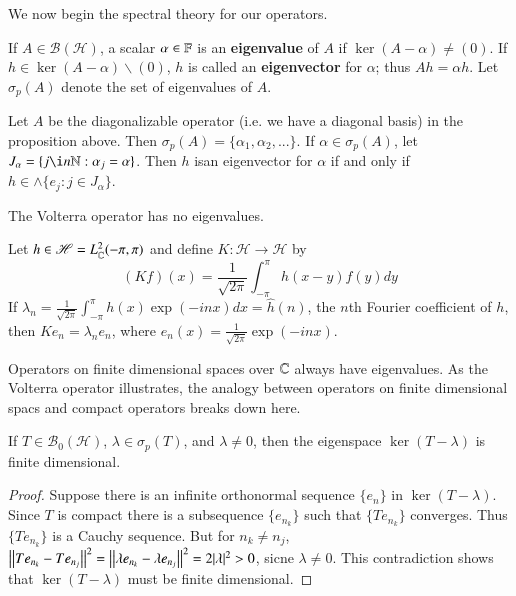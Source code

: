 We now begin the spectral theory for our operators.

\begin{defn}
    If $A \in \mathscr{B}(\mathscr{H})$, a scalar $\alpha \in \mathbb F$ is an \textbf{eigenvalue} of $A$ if $\ker(A-\alpha) \neq (0)$. If $h \in \ker(A-\alpha)\backslash(0)$, $h$ is called an \textbf{eigenvector} for $\alpha$; thus $Ah = \alpha h$. Let $\sigma_p(A)$ denote the set of eigenvalues of $A$.
\end{defn}

\begin{eg}
    Let $A$ be the diagonalizable operator (i.e. we have a diagonal basis) in the proposition above. Then $\sigma_p(A) = \{\alpha_1,\alpha_2,...\}$. If $\alpha \in \sigma_p(A)$, let $J_{\alpha} = \{j \i n\N:\alpha_j = \alpha\}$. Then $h$ isan eigenvector for $\alpha$ if and only if $h \in \land\{e_j:j \in J_{\alpha}\}$.
\end{eg}

\begin{eg}
    The Volterra operator has no eigenvalues.
\end{eg}

\begin{eg}
    Let $h \in \mathscr{H} = L^2_{\mathbb C}(-\pi,\pi)$ and define $K:\mathscr{H}\rightarrow \mathscr{H}$ by $$(Kf)(x) = \frac{1}{\sqrt{2\pi}}\int_{-\pi}^{\pi}h(x-y)f(y)dy$$
    If $\lambda_n = \frac{1}{\sqrt{2\pi}}\int_{-\pi}^{\pi}h(x)\exp(-inx)dx = \hat{h}(n)$, the $n$th Fourier coefficient of $h$, then $Ke_n = \lambda_ne_n$, where $e_n(x) = \frac{1}{\sqrt{2\pi}}\exp(-inx)$.
\end{eg}

Operators on finite dimensional spaces over $\mathbb C$ always have eigenvalues. As the Volterra operator illustrates, the analogy between operators on finite dimensional spacs and compact operators breaks down here.

\begin{prop}
    If $T \in \mathscr{B}_0(\mathscr{H})$, $\lambda \in \sigma_p(T)$, and $\lambda \neq 0$, then the eigenspace $\ker(T-\lambda)$ is finite dimensional.
\end{prop}
\begin{proof}
    Suppose there is an infinite orthonormal sequence $\{e_n\}$ in $\ker(T-\lambda)$. Since $T$ is compact there is a subsequence $\{e_{n_k}\}$ such that $\{Te_{n_k}\}$ converges. Thus $\{Te_{n_k}\}$ is a Cauchy sequence. But for $n_k \neq n_j$, $\left|\left| Te_{n_k}-Te_{n_j}\right|\right|^2 = \left|\left| \lambda e_{n_k}-\lambda e_{n_j}\right|\right|^2 = 2|\lambda|^2 > 0$, sicne $\lambda \neq 0$. This contradiction shows that $\ker(T-\lambda)$ must be finite dimensional.
\end{proof}

